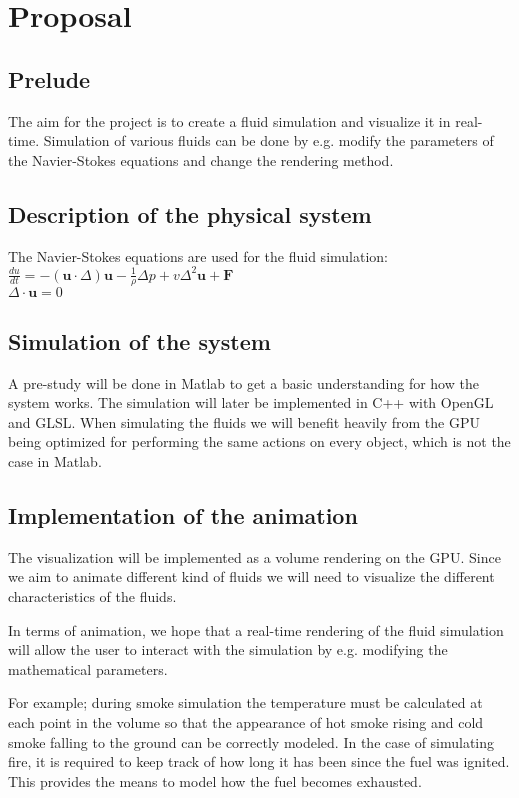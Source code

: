 \documentclass[a4paper,12pt,twoside,swedish]{report}
\begin{document}
\pagestyle{plain}

\setcounter{page}{1}

\chapter{Proposal}

\section{Prelude}
The aim for the project is to create a fluid simulation and visualize it in real-time. Simulation of various fluids can be done by e.g. modify the parameters of the Navier-Stokes equations and change the rendering method.

\section{Description of the physical system}
The Navier-Stokes equations are used for the fluid simulation:\\
\(\frac{du}{dt} = - (\textbf{u}\cdot{\Delta})\textbf{u} - \frac{1}{\rho}\Delta p + v \Delta^2 \textbf{u} + \textbf{F}\) \\
\(\Delta \cdot \textbf{u} = 0 \) \\

\section{Simulation of the system}
A pre-study will be done in Matlab to get a basic understanding for how the system works. The simulation will later be implemented in C++ with OpenGL and GLSL. When simulating the fluids we will benefit heavily from the GPU being optimized for performing the same actions on every object, which is not the case in Matlab.

\section{Implementation of the animation}
The visualization will be implemented as a volume rendering on the GPU. Since we aim to animate different kind of fluids we will need to visualize the different characteristics of the fluids.

In terms of animation, we hope that a real-time rendering of the fluid simulation will allow the user to interact with the simulation by e.g. modifying the mathematical parameters.

For example; during smoke simulation the temperature must be calculated at each point in the volume so that the appearance of hot smoke rising and cold smoke falling to the ground can be correctly modeled. In the case of simulating fire, it is required to keep track of how long it has been since the fuel was ignited. This provides the means to model how the fuel becomes exhausted.
\end{document}
